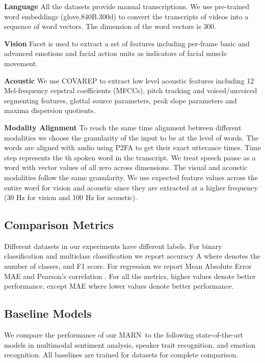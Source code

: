 \documentclass[letterpaper]{article} \usepackage{aaai18}  \usepackage{times}  \usepackage{helvet}  \usepackage{courier}  \usepackage{url}  \usepackage{graphicx}  \usepackage{multirow}
\newcommand{\pipelines}{MARN}
\begin{document}
\textbf{Language} All the datasets provide manual transcriptions. We use pre-trained word embeddings (glove.840B.300d) \cite{pennington2014glove} to convert the transcripts of videos into a sequence of word vectors. The dimension of the word vectors is 300. 

\textbf{Vision} Facet \cite{emotient} is used to extract a set of features including per-frame basic and advanced emotions and facial action units as indicators of facial muscle movement.


\textbf{Acoustic} We use COVAREP \cite{degottex2014covarep} to extract low level acoustic features including 12 Mel-frequency cepstral coefficients (MFCCs), pitch tracking and voiced/unvoiced segmenting features, glottal source parameters, peak slope parameters and maxima dispersion quotients.

\textbf{Modality Alignment} To reach the same time alignment between different modalities we choose the granularity of the input to be at the level of words. The words are aligned with audio using P2FA \cite{P2FA} to get their exact utterance times. Time step  represents the th spoken word in the transcript. We treat speech pause as a word with vector values of all zero across dimensions. The visual and acoustic modalities follow the same granularity. We use expected feature values across the entire word for vision and acoustic since they are extracted at a higher frequency (30 Hz for vision and 100 Hz for acoustic). 

\subsection{Comparison Metrics}
Different datasets in our experiments have different labels. For binary classification and multiclass classification we report accuracy A where  denotes the number of classes, and F1 score. For regression we report Mean Absolute Error MAE and Pearson's correlation . For all the metrics, higher values denote better performance, except MAE where lower values denote better performance. 

\subsection{Baseline Models}
\label{sec:base}
We compare the performance of our \pipelines \ to the following state-of-the-art models in multimodal sentiment analysis, speaker trait recognition, and emotion recognition. All baselines are trained for datasets for complete comparison. 
\end{document}
